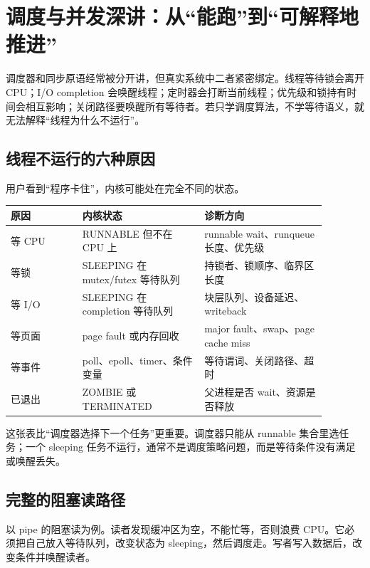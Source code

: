 \section{调度与并发深讲：从“能跑”到“可解释地推进”}

调度器和同步原语经常被分开讲，但真实系统中二者紧密绑定。线程等待锁会离开 CPU；I/O completion 会唤醒线程；定时器会打断当前线程；优先级和锁持有时间会相互影响；关闭路径要唤醒所有等待者。若只学调度算法，不学等待语义，就无法解释“线程为什么不运行”。

\subsection{线程不运行的六种原因}

用户看到“程序卡住”，内核可能处在完全不同的状态。

\begin{longtable}{|p{0.2\linewidth}|p{0.34\linewidth}|p{0.34\linewidth}|}
\toprule
原因 & 内核状态 & 诊断方向 \\
\midrule
等 CPU & RUNNABLE 但不在 CPU 上 & runnable wait、runqueue 长度、优先级 \\\tablerowrule
等锁 & SLEEPING 在 mutex/futex 等待队列 & 持锁者、锁顺序、临界区长度 \\\tablerowrule
等 I/O & SLEEPING 在 completion 等待队列 & 块层队列、设备延迟、writeback \\\tablerowrule
等页面 & page fault 或内存回收 & major fault、swap、page cache miss \\\tablerowrule
等事件 & poll、epoll、timer、条件变量 & 等待谓词、关闭路径、超时 \\\tablerowrule
已退出 & ZOMBIE 或 TERMINATED & 父进程是否 wait、资源是否释放 \\
\bottomrule
\end{longtable}

这张表比“调度器选择下一个任务”更重要。调度器只能从 runnable 集合里选任务；一个 sleeping 任务不运行，通常不是调度策略问题，而是等待条件没有满足或唤醒丢失。

\subsection{完整的阻塞读路径}

以 pipe 的阻塞读为例。读者发现缓冲区为空，不能忙等，否则浪费 CPU。它必须把自己放入等待队列，改变状态为 sleeping，然后调度走。写者写入数据后，改变条件并唤醒读者。

